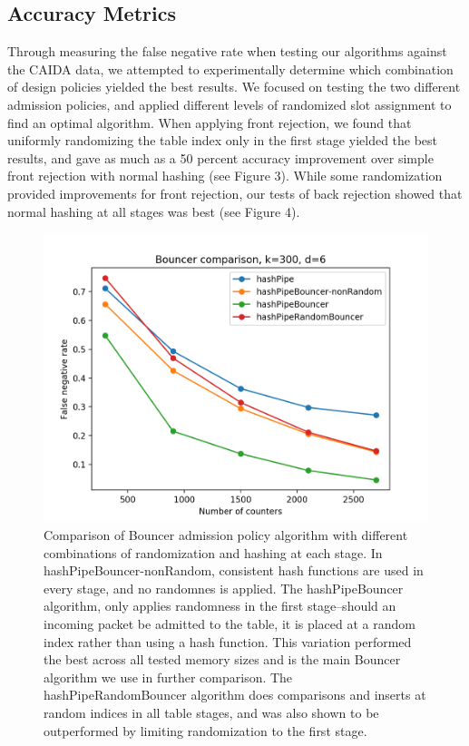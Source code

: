 \subsection{Accuracy Metrics}
Through measuring the false negative rate when testing our algorithms against the CAIDA data, we attempted to experimentally determine which combination of design policies yielded the best results. We focused on testing the two different admission policies, and applied different levels of randomized slot assignment to find an optimal algorithm. When applying front rejection, we found that uniformly randomizing the table index only in the first stage yielded the best results, and gave as much as a 50 percent accuracy improvement over simple front rejection with normal hashing (see Figure 3). While some randomization provided improvements for front rejection, our tests of back rejection showed that normal hashing at all stages was best (see Figure 4).
\begin{figure}[t]
  \centering
    \includegraphics[scale=0.5]{bouncer}
     \caption{Comparison of Bouncer admission policy algorithm with different combinations of randomization and hashing at each stage. In hashPipeBouncer-nonRandom, consistent hash functions are used in every stage, and no randomnes is applied. The hashPipeBouncer algorithm, only applies randomness in the first stage--should an incoming packet be admitted to the table, it is placed at a random index rather than using a hash function. This variation performed the best across all tested memory sizes and is the main Bouncer algorithm we use in further comparison. The hashPipeRandomBouncer algorithm does comparisons and inserts at random indices in all table stages, and was also shown to be outperformed by limiting randomization to the first stage.}
     \label{fig:bp-image}
\end{figure}

